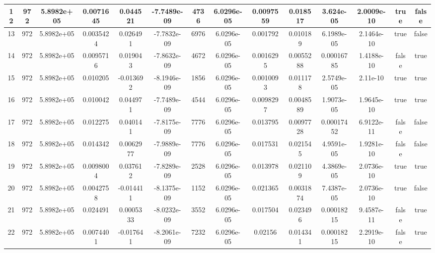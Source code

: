 \documentclass[a4paper, 14pt]{article}
\begin{document}
\begin{landscape}
\begin{longtable}{|c|c|c|c|c|c|c|c|c|c|c|c|c|c|}
    \hline
    12   &   972   &  5.8982e+05  &   0.0071645   &    0.044521  &  -7.7489e-09  &  4736   &  6.0296e-05  &  0.0097559  &   0.018517  &   3.624e-05   & 2.0009e-10  &  true      &  false  \\
    \hline
    13   &   972   &  5.8982e+05  &   0.0035424   &    0.026491  &  -7.7832e-09  &  6976   &  6.0296e-05  &   0.001792  &   0.010189  &  6.1989e-05   & 2.1464e-10  &  true      &  false  \\
    \hline
    14   &   972   &  5.8982e+05  &   0.0095716   &    0.019043  &  -7.8632e-09  &  4672   &  6.0296e-05  &  0.0016295  &  0.0055288  &  0.00016785   & 1.4188e-10  &  false     &  true   \\
    \hline
    15   &   972   &  5.8982e+05  &    0.010205   &   -0.013692  &  -8.1946e-09  &  1856   &  6.0296e-05  &  0.0010093  &   0.011178  &  2.5749e-05   &   2.11e-10  &  true      &  true   \\
    \hline
    16   &   972   &  5.8982e+05  &    0.010042   &    0.044971  &  -7.7489e-09  &  4544   &  6.0296e-05  &  0.0098297  &  0.0048589  &  1.9073e-05   & 1.9645e-10  &  true      &  true   \\
    \hline
    17   &   972   &  5.8982e+05  &    0.012275   &    0.040141  &  -7.8175e-09  &  7776   &  6.0296e-05  &   0.013795  &  0.0097728  &  0.00017452   & 6.9122e-11  &  false     &  false  \\
    \hline
    18   &   972   &  5.8982e+05  &    0.014342   &   0.0062977  &  -7.9889e-09  &  7776   &  6.0296e-05  &   0.017531  &   0.021545  &  4.9591e-05   & 1.9281e-10  &  false     &  false  \\
    \hline
    19   &   972   &  5.8982e+05  &   0.0098004   &    0.037612  &  -7.8289e-09  &  2528   &  6.0296e-05  &   0.013978  &   0.021109  &  4.3869e-05   & 2.0736e-10  &  true      &  true   \\
    \hline
    20   &   972   &  5.8982e+05  &   0.0042758   &   -0.014411  &  -8.1375e-09  &  1152   &  6.0296e-05  &   0.021365  &  0.0031874  &  7.4387e-05   & 2.0736e-10  &  true      &  false  \\
    \hline
    21   &   972   &  5.8982e+05  &    0.024491   &   0.0005333  &  -8.0232e-09  &  3552   &  6.0296e-05  &   0.017504  &   0.023496  &  0.00018215   & 9.4587e-11  &  false     &  true   \\
    \hline
    22   &   972   &  5.8982e+05  &   0.0074401   &   -0.017641  &  -8.2061e-09  &  7232   &  6.0296e-05  &    0.02156  &   0.014341  &  0.00018215   & 2.2919e-10  &  false     &  true   \\

\end{longtable}
\end{landscape}
\end{document}
